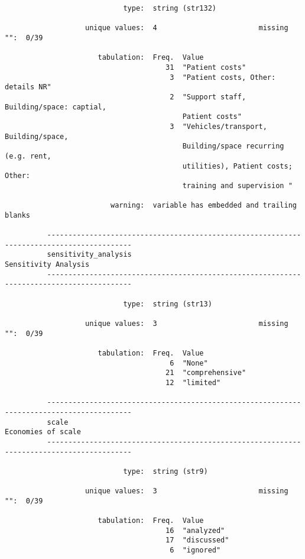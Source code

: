 \documentclass{article}
\begin{document}
\begin{verbatim}
                            type:  string (str132)
          
                   unique values:  4                        missing "":  0/39
          
                      tabulation:  Freq.  Value
                                      31  "Patient costs"
                                       3  "Patient costs, Other: details NR"
                                       2  "Support staff, Building/space: captial,
                                          Patient costs"
                                       3  "Vehicles/transport, Building/space,
                                          Building/space recurring (e.g. rent,
                                          utilities), Patient costs; Other:
                                          training and supervision "
          
                         warning:  variable has embedded and trailing blanks
          
          ------------------------------------------------------------------------------------------
          sensitivity_analysis                                                  Sensitivity Analysis
          ------------------------------------------------------------------------------------------
          
                            type:  string (str13)
          
                   unique values:  3                        missing "":  0/39
          
                      tabulation:  Freq.  Value
                                       6  "None"
                                      21  "comprehensive"
                                      12  "limited"
          
          ------------------------------------------------------------------------------------------
          scale                                                                   Economies of scale
          ------------------------------------------------------------------------------------------
          
                            type:  string (str9)
          
                   unique values:  3                        missing "":  0/39
          
                      tabulation:  Freq.  Value
                                      16  "analyzed"
                                      17  "discussed"
                                       6  "ignored"
          

\end{verbatim}
\end{document}
